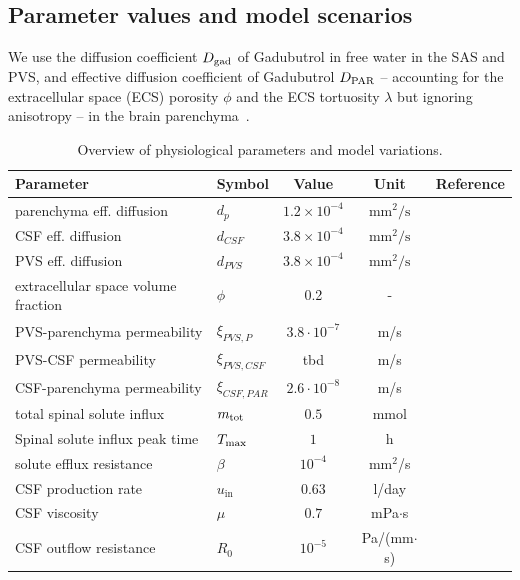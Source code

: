 \documentclass[fleqn,10pt]{wlscirep}
\begin{document}
\subsection*{Parameter values and model scenarios}
We use the diffusion coefficient $D_{\rm gad}$ of Gadubutrol in free water in the SAS and PVS, and effective diffusion coefficient of Gadubutrol $D_{\rm PAR}$ -- accounting for the extracellular space (ECS) porosity $\phi$ and the ECS tortuosity $\lambda$ but ignoring anisotropy  -- in the brain parenchyma~\cite{hornkjol2022csf}. 
\begin{table}
  \begin{center}
    \begin{tabular}{ll|ccc}
      \toprule
      Parameter& Symbol & Value & Unit& Reference\\
      \midrule
         parenchyma eff. diffusion&  $d_p$&  $1.2 \times 10^{-4}$& $\text{mm}^2/\text{s}$  & \cite{valnes2020apparent}\\
         CSF eff. diffusion&  $d_{CSF}$&  $3.8 \times 10^{-4}$& $\text{mm}^2/\text{s}$ & \cite{valnes2020apparent}\\
         PVS eff. diffusion&  $d_{PVS}$&  $3.8 \times 10^{-4}$& $\text{mm}^2/\text{s}$ & \cite{valnes2020apparent}\\
         extracellular space volume fraction& $\phi$& 0.2& - &\cite{nicholson1981ion} \\
         PVS-parenchyma permeability&  $\xi_{PVS,P}$ & $3.8\cdot 10^{-7}$  & m/s & \cite{koch2023estimates} \\
         PVS-CSF permeability&  $\xi_{PVS,CSF}$& tbd & m/s & \\
         CSF-parenchyma permeability&  $\xi_{CSF,PAR}$& $2.6 \cdot 10^{-8}$ & m/s & \cite{riseth2025twocompartment} \\
         \midrule
         total spinal solute influx & $m_{\rm tot}$  & $0.5$ & mmol  & \cite{eide2024functional} \\
         Spinal solute influx peak time & $T_{\rm max}$ & $1$  & h & \\
         solute efflux resistance & $\beta$  & $10^{-4}$ & mm$^2$/s & \cite{hornkjol2022csf} \\
         \midrule
         CSF production rate & $u_{\mathrm{in}}$ & $0.63$  & l/day & \cite{nilsson1992circadian} \\
         CSF viscosity & $\mu$ & $0.7$  & mPa$ \cdot $s & \cite{bloomfield1998effects} \\ 
        CSF outflow resistance & $R_0$ & $10^{-5}$  & Pa/(mm$\cdot$s) & \cite{hornkjol2022csf} \\ 
        \bottomrule
    \end{tabular}
  \end{center}
  \caption{Overview of physiological parameters and model variations. 
  }
  \label{tab:overview}
\end{table}
\end{document}
